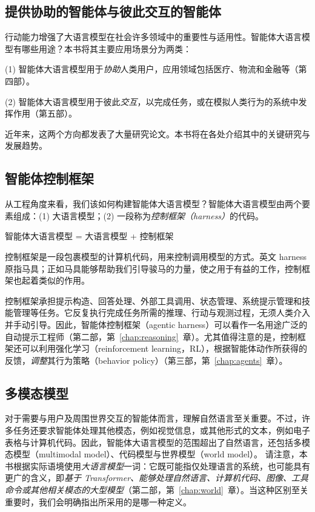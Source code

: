\subsection{提供协助的智能体与彼此交互的智能体}

行动能力增强了大语言模型在社会许多领域中的重要性与适用性。智能体大语言模型有哪些用途？本书将其主要应用场景分为两类：

(1) 智能体大语言模型用于{\em 协助}人类用户，应用领域包括医疗、物流和金融等（第四部）。

(2) 智能体大语言模型用于彼此{\em 交互}，以完成任务，或在模拟人类行为的系统中发挥作用（第五部）。

近年来，这两个方向都发表了大量研究论文。本书将在各处介绍其中的关键研究与发展趋势。

\subsection{智能体控制框架}
从工程角度来看，我们该如何构建智能体大语言模型？智能体大语言模型由两个要素组成：(1) 大语言模型；(2) 一段称为{\em 控制框架（harness）}的代码。
\begin{center}智能体大语言模型 = 大语言模型 + 控制框架\end{center}
控制框架是一段包裹模型的计算机代码，用来控制调用模型的方式。英文 harness 原指马具；正如马具能够帮助我们引导骏马的力量，使之用于有益的工作，控制框架也起着类似的作用。

控制框架承担提示构造、回答处理、外部工具调用、状态管理、系统提示管理和技能管理等任务。它反复执行完成任务所需的推理、行动与观测过程，无须人类介入并手动引导。因此，智能体控制框架（agentic harness）可以看作一名用途广泛的自动提示工程师（第二部，第~\ref{chap:reasoning}~章）。尤其值得注意的是，控制框架还可以利用强化学习（reinforcement learning，RL），根据智能体动作所获得的反馈，{\em 调整}其行为策略（behavior policy）（第三部，第~\ref{chap:agents}~章）。

\subsection{多模态模型}
对于需要与用户及周围世界交互的智能体而言，理解自然语言至关重要。不过，许多任务还要求智能体处理其他模态，例如视觉信息，或其他形式的文本，例如电子表格与计算机代码。因此，智能体大语言模型的范围超出了自然语言，还包括多模态模型（multimodal model）、代码模型与世界模型（world model）。
请注意，本书根据实际语境使用{\em 大语言模型}一词：它既可能指仅处理语言的系统，也可能具有更广的含义，即{\em 基于 Transformer、能够处理自然语言、计算机代码、图像、工具命令或其他相关模态的大型模型}（第二部，第~\ref{chap:world}~章）。当这种区别至关重要时，我们会明确指出所采用的是哪一种定义。

